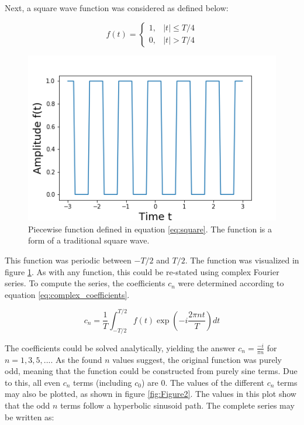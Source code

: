 \documentclass[twocolumn]{article}
\begin{document}
Next, a square wave function was considered as defined below: 

\[ 
f(t)=
\begin{cases}
1, & |t| \leq T/4 \label{eq:square}
\\
0, & |t| > T/4
\end{cases}
\]

\begin{figure}
\centering
\includegraphics[width=\linewidth]{Figure1}
\caption{Piecewise function defined in equation \ref{eq:square}. The function is a form of a traditional square wave.}
\label{fig:Figure1}
\end{figure}


This function was periodic between $-T/2$ and $T/2$. The function was visualized in figure \ref{fig:Figure1}. As with any function, this could be re-stated using complex Fourier series. To compute the series, the coefficients $c_n$ were determined according to equation \ref{eq:complex_coefficients}. 

\begin{equation}
c_n = \frac{1}{T} \int_{-T/2}^{T/2} f(t) \exp(-i\frac{2\pi nt}{T}) dt
\label{eq:complex_coefficients}
\end{equation}

The coefficients could be solved analytically, yielding the answer $c_n = \frac{-i}{\pi n}$ for $n = 1, 3, 5, ...$. As the found $n$ values suggest, the original function was purely odd, meaning that the function could be constructed from purely sine terms. Due to this, all even $c_n$ terms (including $c_0$) are $0$. The values of the different $c_n$ terms may also be plotted, as shown in figure \ref{fig:Figure2}. The values in this plot show that the odd $n$ terms follow a hyperbolic sinusoid path. The complete series may be written as:
\end{document}
